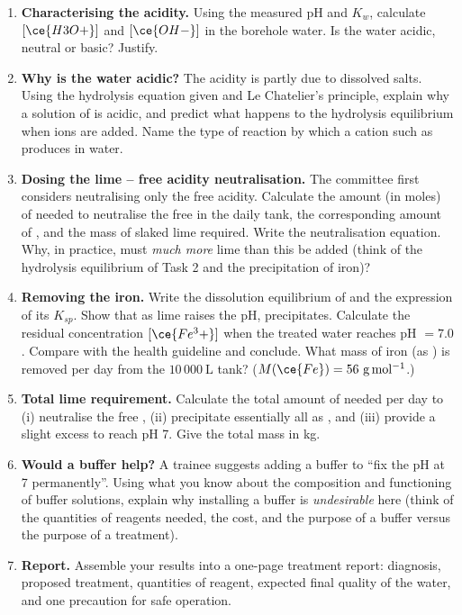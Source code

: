 \documentclass[11pt]{article}
\newcommand{\cle}[1]{{\popxbold\color{popdark}#1}}
\begin{document}
\begin{enumerate}
\item \textbf{Characterising the acidity.} Using the measured pH and $K_w$, calculate $[\ce{H3O+}]$ and $[\ce{OH-}]$ in the borehole water. Is the water acidic, neutral or basic? Justify.

\item \textbf{Why is the water acidic?} The acidity is partly due to dissolved  salts. Using the hydrolysis equation given and \cle{Le Chatelier's principle}, explain why a solution of  is acidic, and predict what happens to the hydrolysis equilibrium when  ions are added. Name the type of reaction by which a cation such as  produces  in water.

\item \textbf{Dosing the lime -- free acidity neutralisation.} The committee first considers neutralising only the free acidity. Calculate the amount (in moles) of  needed to neutralise the free  in the daily tank, the corresponding amount of , and the mass of slaked lime required. Write the neutralisation equation. Why, in practice, must \emph{much more} lime than this be added (think of the hydrolysis equilibrium of Task 2 and the precipitation of iron)?

\item \textbf{Removing the iron.} Write the dissolution equilibrium of  and the expression of its $K_{sp}$. Show that as lime raises the pH,  precipitates. Calculate the residual concentration $[\ce{Fe^3+}]$ when the treated water reaches pH $= 7.0$. Compare with the health guideline and conclude. What mass of iron (as ) is removed per day from the $10\,000\ \mathrm{L}$ tank? ($M(\ce{Fe}) = 56\ \mathrm{g\,mol^{-1}}$.)

\item \textbf{Total lime requirement.} Calculate the total amount of  needed per day to (i) neutralise the free , (ii) precipitate essentially all  as , and (iii) provide a slight excess to reach pH 7. Give the total mass in kg.

\item \textbf{Would a buffer help?} A trainee suggests adding a buffer to ``fix the pH at 7 permanently''. Using what you know about the composition and functioning of buffer solutions, explain why installing a buffer is \emph{undesirable} here (think of the quantities of reagents needed, the cost, and the purpose of a buffer versus the purpose of a treatment).

\item \textbf{Report.} Assemble your results into a one-page treatment report: diagnosis, proposed treatment, quantities of reagent, expected final quality of the water, and one precaution for safe operation.
\end{enumerate}
\end{document}
